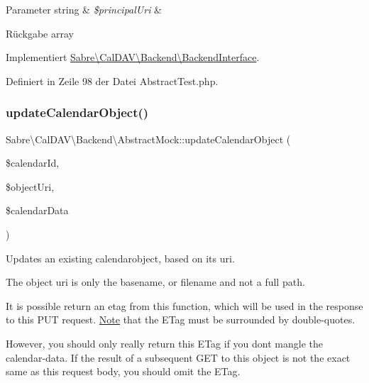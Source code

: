 \begin{DoxyParams}[1]{Parameter}
string & {\em \$principal\+Uri} & \\
\hline
\end{DoxyParams}
\begin{DoxyReturn}{Rückgabe}
array 
\end{DoxyReturn}


Implementiert \mbox{\hyperlink{interface_sabre_1_1_cal_d_a_v_1_1_backend_1_1_backend_interface_a41d069c48af0155b8e6e04bee46c70ba}{Sabre\textbackslash{}\+Cal\+D\+A\+V\textbackslash{}\+Backend\textbackslash{}\+Backend\+Interface}}.



Definiert in Zeile 98 der Datei Abstract\+Test.\+php.

\mbox{\label{class_sabre_1_1_cal_d_a_v_1_1_backend_1_1_abstract_mock_a478a6153bbae1f88081672c914754e57}} 
\subsubsection{\texorpdfstring{update\+Calendar\+Object()}{updateCalendarObject()}}
{\footnotesize\ttfamily Sabre\textbackslash{}\+Cal\+D\+A\+V\textbackslash{}\+Backend\textbackslash{}\+Abstract\+Mock\+::update\+Calendar\+Object (\begin{DoxyParamCaption}\item[{}]{\$calendar\+Id,  }\item[{}]{\$object\+Uri,  }\item[{}]{\$calendar\+Data }\end{DoxyParamCaption})}

Updates an existing calendarobject, based on it\textquotesingle{}s uri.

The object uri is only the basename, or filename and not a full path.

It is possible return an etag from this function, which will be used in the response to this P\+UT request. \mbox{\hyperlink{class_note}{Note}} that the E\+Tag must be surrounded by double-\/quotes.

However, you should only really return this E\+Tag if you don\textquotesingle{}t mangle the calendar-\/data. If the result of a subsequent G\+ET to this object is not the exact same as this request body, you should omit the E\+Tag.


